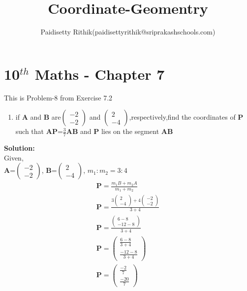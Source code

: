 \documentclass[12pt]{article}
\title{Coordinate-Geomentry}
\author{Paidisetty Rithik(paidisettyrithik@sriprakashschools.com)}
\newcommand{\myvec}[1]{\ensuremath{\begin{pmatrix}#1\end{pmatrix}}}
\newcommand{\solution}{\noindent \textbf{Solution: }}
\let\vec\mathbf
\begin{document}
\maketitle
\section*{10$^{th}$ Maths - Chapter 7}
This is Problem-8 from Exercise 7.2
\begin{enumerate}
\item if $\vec{A}$ and $\vec{B}$ are\myvec{-2\\-2} and \myvec{2\\-4},respectively,find the coordinates of $\vec{P}$ such that $\vec{AP}$=$\frac{3}{7}\vec{AB}$ and $\vec{P}$ lies on the segment $\vec{AB}$ \\
\end{enumerate}
\solution \\
Given,\\
$\vec{A}$=\myvec{-2\\-2}, $\vec{B}$=\myvec{2\\-4},
$m_1:m_2=3:4$
\begin{align}
\vec{P}=\frac{m_1B+m_2A}{m_1+m_2}\\
\vec{P}=\frac{3\myvec{2\\-4}+4\myvec{-2\\-2}}{3+4}\\
\vec{P}=\frac{\myvec{6-8\\-12-8}}{3+4}\\
\vec{P}=\myvec{\frac{6-8}{3+4}\\\frac{-12-8}{3+4}}\\
\vec{P}=\myvec{\frac{-2}{7}\\\frac{-20}{7}}
\end{align}
\end{document}
